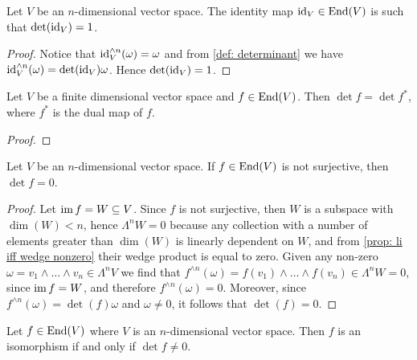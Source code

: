 \begin{proposition}\label{prop: id det}
Let \(V\) be an \(n\)-dimensional vector space. The identity map \(\operatorname{id}_V \in
\operatorname{End}(V)\) is such that \(\det(\operatorname{id}_V) = 1\).
\end{proposition}

\begin{proof}
Notice that \(\operatorname{id}_V^{\wedge n}(\omega) = \omega\) and from \cref{def:
determinant} we have \(\operatorname{id}_V^{\wedge n}(\omega) = \det(\operatorname{id}_V) \omega\). Hence
\(\det(\operatorname{id}_V) = 1\).
\end{proof}

\begin{proposition}
Let \(V\) be a finite dimensional vector space and \(f \in \operatorname{End}(V)\). Then
\(\det f = \det f^*\), where \(f^*\) is the dual map of \(f\).
\end{proposition}

\begin{proof}

\end{proof}



\begin{lemma}\label{lem: not surjective 0 det}
Let \(V\) be an \(n\)-dimensional vector space. If \(f \in \operatorname{End}(V)\) is not
surjective, then \(\det f = 0\).
\end{lemma}

\begin{proof}
Let \(\operatorname{im} f = W \subseteq V\). Since \(f\) is not surjective, then \(W\) is a
subspace with \(\dim(W) < n\), hence \(\Lambda^n W = 0\) because any
collection with a number of elements greater than \(\dim(W)\) is linearly
dependent on \(W\), and from \cref{prop: li iff wedge nonzero} their wedge
product is equal to zero. Given any non-zero \(\omega = v_1 \wedge \dots \wedge
v_n \in \Lambda^n V\) we find that \(f^{\wedge n}(\omega) = f(v_1) \wedge
\dots \wedge f(v_n) \in \Lambda^n W = 0\), since \(\operatorname{im} f = W\), and therefore
\(f^{\wedge n}(\omega) = 0\). Moreover, since \(f^{\wedge n}(\omega) = \det(f)
\omega\) and \(\omega \neq 0\), it follows that \(\det(f) = 0\).
\end{proof}

\begin{proposition}
\label{prop: iso det}
Let \(f \in \operatorname{End}(V)\) where \(V\) is an \(n\)-dimensional vector space. Then
\(f\) is an isomorphism if and only if \(\det f \neq 0\).
\end{proposition}

